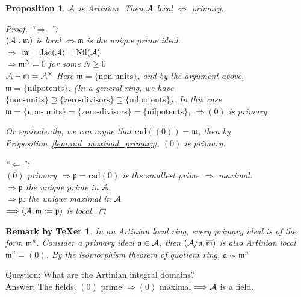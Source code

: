 \documentclass[11pt]{article}
\newtheorem{prop}[thm]{Proposition}
\newtheorem{rmkt}[thm]{Remark by TeXer}
\newcommand{\sca}{{\mathfrak a}}
\newcommand{\scm}{{\mathfrak m}}
\newcommand{\scp}{{\mathfrak p}}
\newcommand{\cala}{{\cal A}}
\newcommand{\Lrta}{\Longrightarrow}
\newcommand{\Llta}{\Longleftarrow}
\newcommand{\Llrta}{\Longleftrightarrow}
\begin{document}
\begin{prop}\label{prop:artin_local=artin_primary}
$\cala$ is Artinian.  Then $\cala$ local $\Llrta $ primary.
\begin{proof}
``$\Lrta$ '':\\
$(\cala:\scm)$ is local $\Llrta \scm $ is the unique prime ideal.\\
$\Lrta$ $\scm=\text{Jac}(\cala)=\text{Nil}(  \cala)$\\
$\Lrta\scm^N=0$ for some $N\geq 0$\\
$\cala-\scm=\cala^\times$
Here $\scm=\{\text{non-units}\}$, and by the argument above, $\scm=\{\text{nilpotents}\}$. (In a general ring, we have $\{\text{non-units}\}\supseteq\{\text{zero-divisors}\}\supseteq\{\text{nilpotents}\}$). In this case $\scm=\{\text{non-units}\}=\{\text{zero-divisors}\}=\{\text{nilpotents}\}$, $\Lrta(0)$ is primary.

Or equivalently, we can argue that $\text{rad}((0))=\scm$, then by Proposition~\ref{lem:rad_maximal_primary}, $(0)$ is primary.

``$\Llta$'':\\
 $(0)$ primary $\Lrta \scp=\text{rad}(0)$ is the smallest prime $\Lrta$ maximal.\\
$\Lrta\scp$ the unique prime in $\cala$\\
$\Lrta\scp$: the unique maximal in $\cala$\\
$\Lrta(\cala,\scm:=\scp)$ is local.

\end{proof}
\end{prop}

\begin{rmkt}
In an Artinian local ring, every primary ideal is of the form $\scm^n$. Consider a primary ideal $\sca\in\cala$, then $(\cala/\sca,\overline{\scm})$ is also Artinian local $\overline{\scm}^n=(0)$. By the isomorphism theorem of quotient ring, $\sca\sim\scm^n$
\end{rmkt}

Question: What are the Artinian   integral domains?\\
Answer: The fields. $(0)$ prime $\Lrta (0)$ maximal $\Lrta \cala$ is a field. 
\end{document}
